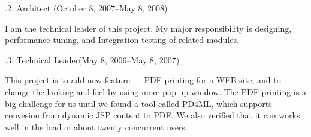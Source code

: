 \smallskip\noindent
{}.2. Architect (October 8, 2007--May 8, 2008)\par
\noindent






I am the technical leader of this project. My major responsibility is
designing, performance tuning, and Integration testing of related modules.

\smallskip\noindent
{}.3. Technical Leader(May 8, 2006--May 8, 2007)\par
\noindent
This project is to add new feature --- PDF printing for a WEB site, and to change the looking and feel by using more pop up window. The PDF printing is a big challenge for us until we found a tool called PD4ML, which supports convesion from dynamic JSP content to PDF. We also verified that it can works well in the load of about twenty concurrent users. 

